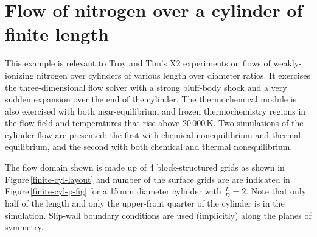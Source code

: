 
\section{Flow of nitrogen over a cylinder of finite length}
\label{sec:finite-cyl-sec}
%
This example is relevant to Troy and Tim's X2 experiments on flows of weakly-ionizing
nitrogen over cylinders of various length over diameter ratios.
It exercises the three-dimensional flow solver with a strong bluff-body shock and
a very sudden expansion over the end of the cylinder.
The thermochemical module is also exercised with both near-equilibrium and frozen thermochemistry
regions in the flow field and temperatures that rise above 20\,000\,K.
Two simulations of the cylinder flow are presented: the first with chemical nonequilibrium and thermal equilibrium, and 
the second with both chemical and thermal nonequilibrium.

\medskip
The flow domain shown is made up of 4 block-structured grids as shown in Figure\,\ref{finite-cyl-layout}
and number of the surface grids are are indicated in Figure\,\ref{finite-cyl-p-fig} for a 15\,mm diameter cylinder 
with $\frac{L}{D} = 2$.
Note that only half of the length and only the upper-front quarter 
of the cylinder is in the simulation.
Slip-wall boundary conditions are used (implicitly) along the planes of symmetry.

